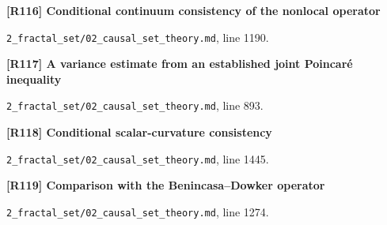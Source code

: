 \documentclass[11pt,a4paper]{article}
\begin{document}
\par\medskip\noindent\begin{minipage}{\linewidth}\textbf{[R116] Conditional continuum consistency of the nonlocal operator}\label{src:thm-cst-fractal-dalembertian-consistency}\par
{\small\texttt{}\par
\nolinkurl{2_fractal_set/02_causal_set_theory.md}, line 1190.\par}
\end{minipage}\par

\par\medskip\noindent\begin{minipage}{\linewidth}\textbf{[R117] A variance estimate from an established joint Poincaré inequality}\label{src:lem-cst-poincare-variance}\par
{\small\texttt{}\par
\nolinkurl{2_fractal_set/02_causal_set_theory.md}, line 893.\par}
\end{minipage}\par

\par\medskip\noindent\begin{minipage}{\linewidth}\textbf{[R118] Conditional scalar-curvature consistency}\label{src:thm-fractal-gas-ricci}\par
{\small\texttt{}\par
\nolinkurl{2_fractal_set/02_causal_set_theory.md}, line 1445.\par}
\end{minipage}\par

\par\medskip\noindent\begin{minipage}{\linewidth}\textbf{[R119] Comparison with the Benincasa–Dowker operator}\label{src:rem-cst-bd-comparison}\par
{\small\texttt{}\par
\nolinkurl{2_fractal_set/02_causal_set_theory.md}, line 1274.\par}
\end{minipage}\par
\end{document}
